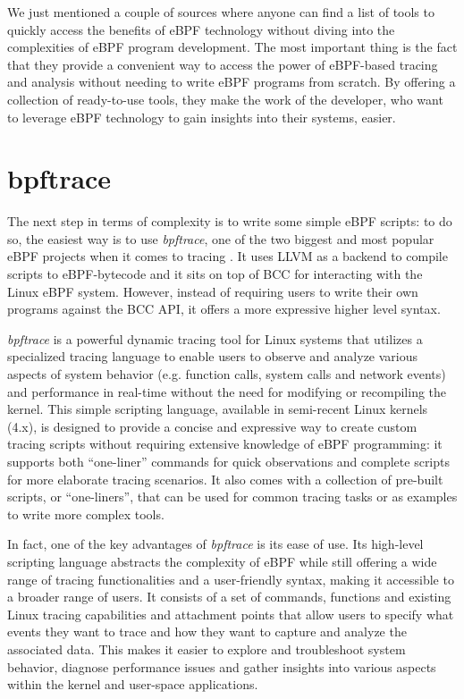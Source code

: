 We just mentioned a couple of sources where anyone can find a list of tools to quickly access the benefits of eBPF technology without diving into the complexities of eBPF program development.
The most important thing is the fact that they provide a convenient way to access the power of eBPF-based tracing and analysis without needing to write eBPF programs from scratch. 
By offering a collection of ready-to-use tools, they make the work of the developer, who want to leverage eBPF technology to gain insights into their systems, easier.

\section{bpftrace}

The next step in terms of complexity is to write some simple eBPF scripts: to do so, the easiest way is to use \textit{bpftrace}, one of the two biggest and most popular eBPF projects when it comes to tracing \cite{bpftraceRepo}.
It uses LLVM as a backend to compile scripts to eBPF-bytecode and it sits on top of BCC for interacting with the Linux eBPF system.
However, instead of requiring users to write their own programs against the BCC API, it offers a more expressive higher level syntax.

\textit{bpftrace} is a powerful dynamic tracing tool for Linux systems that utilizes a specialized tracing language to enable users to observe and analyze various aspects of system behavior (e.g. function calls, system calls and network events) and performance in real-time without the need for modifying or recompiling the kernel.
This simple scripting language, available in semi-recent Linux kernels (4.x), is designed to provide a concise and expressive way to create custom tracing scripts without requiring extensive knowledge of eBPF programming: it supports both ``one-liner'' commands for quick observations and complete scripts for more elaborate tracing scenarios.
It also comes with a collection of pre-built scripts, or ``one-liners'', that can be used for common tracing tasks or as examples to write more complex tools. 

In fact, one of the key advantages of \textit{bpftrace} is its ease of use. 
Its high-level scripting language abstracts the complexity of eBPF while still offering a wide range of tracing functionalities and a user-friendly syntax, making it accessible to a broader range of users. 
It consists of a set of commands, functions and existing Linux tracing capabilities and attachment points that allow users to specify what events they want to trace and how they want to capture and analyze the associated data.
This makes it easier to explore and troubleshoot system behavior, diagnose performance issues and gather insights into various aspects within the kernel and user-space applications.

